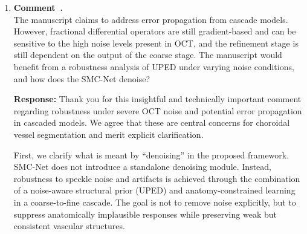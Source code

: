 \documentclass[11pt]{article}
\newcommand{\commentresponse}[2]{{\color{blue}\textbf{Response:} #2}}
\newcommand{\commentitem}{\item \textbf{Comment~\arabic{enumi}.}\\\ignorespaces}
\begin{document}
\begin{enumerate}
{    In summary, the Mamba-based U-shaped coarse segmentation network learns a robust, global localization of the choroidal layer and acts as an anatomical ROI filter, while UPED provides complementary structural edge priors.
    Their combination enables effective noise/artifact suppression and stable coarse-to-fine refinement.
    
    The corresponding clarification has been added to Sec.~III-A of the revised manuscript and is quoted below for convenience: \\
    \textit{{\color{blue}``For an input OCT image $x \in \mathbb{R}^{H \times W \times 3}$, the structural information $s$ is extracted by the proposed unsupervised prior edge detector $\text{UPED}$: $s = \text{UPED}(x)$, $s \in \mathbb{R}^{H \times W \times 3}$. The pretrained coarse segmentation network $\varPhi_{\text{Pre}}(\cdot)$ produces a coarse choroidal mask $m_c = \varPhi_{\text{Pre}}(x)$, which is applied to both the original OCT image $x$ and the extracted structural information $s$ to obtain region-of-interest inputs for the refinement stage:
$x_{\text{masked}} = m_c \cap x, \quad s_{\text{masked}} = m_c \cap s,$ where $x_{\text{masked}}, s_{\text{masked}} \in \mathbb{R}^{H \times W \times 1}$.
By restricting the refinement stage to the predicted choroidal region, the cascaded design effectively suppresses non-choroidal noise and artifacts, enabling the subsequent stage to focus on delineating subtle vascular structures within the choroid.
The masked OCT image and structural information are then fed into the refinement stage.''}}
    }

    \commentitem The manuscript claims to address error propagation from cascade models. However, fractional differential operators are still gradient-based and can be sensitive to the high noise levels present in OCT, and the refinement stage is still dependent on the output of the coarse stage. The manuscript would benefit from a robustness analysis of UPED under varying noise conditions, and how does the SMC-Net denoise?
    
    \commentresponse{4}{
    Thank you for this insightful and technically important comment regarding robustness under severe OCT noise and potential error propagation in cascaded models. We agree that these are central concerns for choroidal vessel segmentation and merit explicit clarification.

    First, we clarify what is meant by ``denoising'' in the proposed framework. SMC-Net does not introduce a standalone denoising module. Instead, robustness to speckle noise and artifacts is achieved through the combination of a noise-aware structural prior (UPED) and anatomy-constrained learning in a coarse-to-fine cascade. The goal is not to remove noise explicitly, but to suppress anatomically implausible responses while preserving weak but consistent vascular structures.

}
\end{enumerate}
\end{document}
